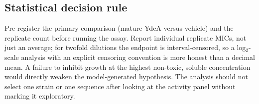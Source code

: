 \subsection{Statistical decision rule}
Pre-register the primary comparison (mature YdcA versus vehicle) and the
replicate count before running the assay. Report individual replicate MICs,
not just an average; for twofold dilutions the endpoint is interval-censored,
so a log$_2$-scale analysis with an explicit censoring convention is more
honest than a decimal mean. A failure to inhibit growth at the highest
non-toxic, soluble concentration would directly weaken the model-generated
hypothesis. The analysis should not select one strain or one sequence after
looking at the activity panel without marking it exploratory.
